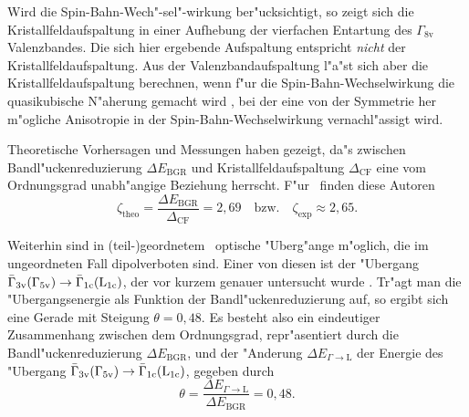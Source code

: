 
Wird die Spin-Bahn-Wech"-sel"-wirkung ber"ucksichtigt, so zeigt sich die
Kristallfeldaufspaltung in einer Aufhebung der vierfachen Entartung des
$\Gamma_{\text{8v}}$ Valenzbandes. Die sich hier ergebende Aufspaltung
entspricht \emph{nicht} der Kristallfeldaufspaltung. Aus der
Valenzbandaufspaltung l"a"st sich aber die Kristallfeldaufspaltung berechnen,
wenn f"ur die Spin-Bahn-Wechselwirkung die quasikubische N"aherung gemacht
wird \cite{bipi:74}, bei der eine von der Symmetrie her m"ogliche Anisotropie
in der Spin-Bahn-Wechselwirkung vernachl"assigt wird. 

Theoretische Vorhersagen \cite{wezu:98} und Messungen \cite{fzcm:97,fgmz:98}
haben gezeigt, da"s zwischen Bandl"uckenreduzierung $\Delta E_{\text{BGR}}$ und
Kristallfeldaufspaltung $\Delta_{\text{CF}}$ eine vom Ordnungsgrad
unabh"angige Beziehung herrscht. F"ur \GaInP\ finden diese Autoren
%
\begin{equation}
  \label{eq:zeta}
  \zeta_{\text{theo}} = \frac{\Delta E_{\text{BGR}}}{\Delta_{\text{CF}}} = 2,69
  \quad \text{bzw.} \quad \zeta_{\text{exp}} \approx 2,65 .
\end{equation}
%

Weiterhin sind in (teil-)geordnetem \GaInP\ optische "Uberg"ange m"oglich, die
im ungeordneten Fall dipolverboten sind. Einer von diesen ist der "Ubergang
$\protect\bar \Gamma_{3 \text{v}}(\Gamma_{5 \text{v}}) \rightarrow \protect\bar \Gamma_{1 \text{c}} (\text{L}_{1 \text{c}})$, der vor kurzem genauer
untersucht wurde \cite{kksk:99}. Tr"agt man die "Ubergangsenergie als Funktion der
Bandl"uckenreduzierung auf, so ergibt sich eine Gerade mit Steigung
$\theta = 0,48$. Es besteht also ein eindeutiger Zusammenhang zwischen dem
Ordnungsgrad, repr"asentiert durch die Bandl"uckenreduzierung $\Delta
E_{\text{BGR}}$, und der "Anderung $\Delta E_{\Gamma \rightarrow \text{L}}$
der Energie des "Ubergang $\protect\bar \Gamma_{3 \text{v}}(\Gamma_{5 \text{v}}) \rightarrow \protect\bar \Gamma_{1 \text{c}} (\text{L}_{1 \text{c}})$, gegeben
durch 
%
\begin{equation}
  \label{eq:theta}
  \theta = \frac{\Delta E_{\Gamma \rightarrow \text{L}}}
  {\Delta E_{\text{BGR}}} = 0,48 .
\end{equation}
%



